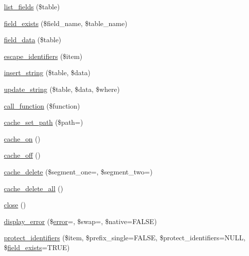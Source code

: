 \begin{DoxyCompactItemize}
\item 
\mbox{\hyperlink{class_c_i___d_b__driver_abfedb79091a4392eb4246bb944c7ce41}{list\+\_\+fields}} (\$table)
\item 
\mbox{\hyperlink{class_c_i___d_b__driver_ab5860c350fadfc004f1a44e232d5899d}{field\+\_\+exists}} (\$field\+\_\+name, \$table\+\_\+name)
\item 
\mbox{\hyperlink{class_c_i___d_b__driver_a918be1044a2ca9279dee956c1199699e}{field\+\_\+data}} (\$table)
\item 
\mbox{\hyperlink{class_c_i___d_b__driver_a0d40bc79643516205ebc37d04f41cc4b}{escape\+\_\+identifiers}} (\$item)
\item 
\mbox{\hyperlink{class_c_i___d_b__driver_aa851138452d2b56e3034be3daf9949e1}{insert\+\_\+string}} (\$table, \$data)
\item 
\mbox{\hyperlink{class_c_i___d_b__driver_a8bf17c0f0ad7b56dcf7641f8559ba591}{update\+\_\+string}} (\$table, \$data, \$where)
\item 
\mbox{\hyperlink{class_c_i___d_b__driver_a3f47277d957abab4cece64f9a344b794}{call\+\_\+function}} (\$function)
\item 
\mbox{\hyperlink{class_c_i___d_b__driver_a6638f718383c9d3c5f4bfbd6fdb24c31}{cache\+\_\+set\+\_\+path}} (\$path=\textquotesingle{}\textquotesingle{})
\item 
\mbox{\hyperlink{class_c_i___d_b__driver_ac3840253abd6fb039225ee9aeea64269}{cache\+\_\+on}} ()
\item 
\mbox{\hyperlink{class_c_i___d_b__driver_a63e71ad3feb03f04fd731acc8189d8ad}{cache\+\_\+off}} ()
\item 
\mbox{\hyperlink{class_c_i___d_b__driver_a8e44d693a9ec55eb9279791deb25cff3}{cache\+\_\+delete}} (\$segment\+\_\+one=\textquotesingle{}\textquotesingle{}, \$segment\+\_\+two=\textquotesingle{}\textquotesingle{})
\item 
\mbox{\hyperlink{class_c_i___d_b__driver_af628f1d49637ba848cefa74e779590a9}{cache\+\_\+delete\+\_\+all}} ()
\item 
\mbox{\hyperlink{class_c_i___d_b__driver_a4ce5f03a40f56cb09bd1f17d6826296e}{close}} ()
\item 
\mbox{\hyperlink{class_c_i___d_b__driver_ae75ae91c317477f106ebb05bfca996b1}{display\+\_\+error}} (\$\mbox{\hyperlink{class_c_i___d_b__driver_af957efc0046c214f6fa9b3b80115991e}{error}}=\textquotesingle{}\textquotesingle{}, \$swap=\textquotesingle{}\textquotesingle{}, \$native=F\+A\+L\+SE)
\item 
\mbox{\hyperlink{class_c_i___d_b__driver_ada7e8a59334d3badca419b84f4123036}{protect\+\_\+identifiers}} (\$item, \$prefix\+\_\+single=F\+A\+L\+SE, \$protect\+\_\+identifiers=N\+U\+LL, \$\mbox{\hyperlink{class_c_i___d_b__driver_ab5860c350fadfc004f1a44e232d5899d}{field\+\_\+exists}}=T\+R\+UE)
\end{DoxyCompactItemize}
